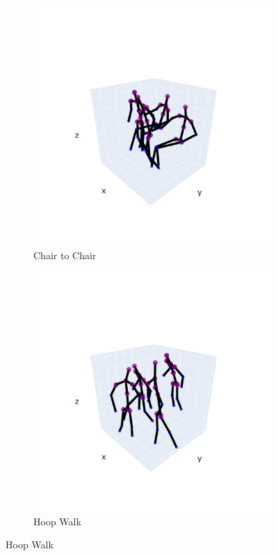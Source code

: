         \begin{figure}[h]
            \begin{subfigure}{.5\textwidth}
                \centering
                \includegraphics[width=.9\linewidth]{../src/resources/plots/movements/mov-0.png}
                \caption{Chair to Chair}
                \label{fig:mov-0}
            \end{subfigure}
            \begin{subfigure}{.5\textwidth}
                \centering
                \includegraphics[width=.9\linewidth]{../src/resources/plots/movements/mov-1.png}
                \caption{Hoop Walk}
                \label{fig:mov-1}
            \end{subfigure}
            

\end{figure}
